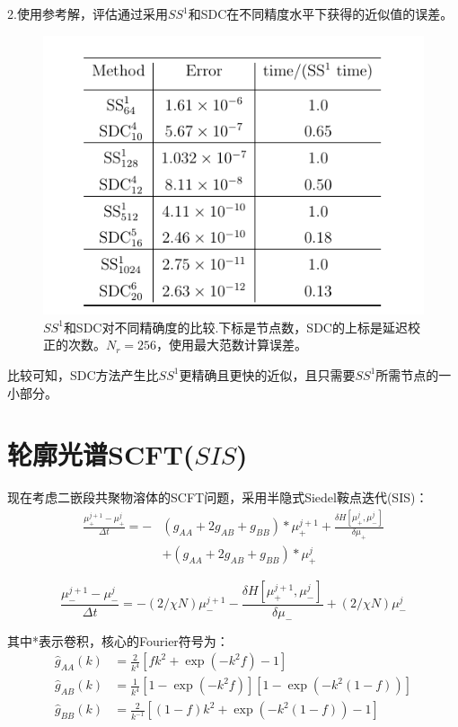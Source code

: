 2.使用参考解，评估通过采用$SS^1$和SDC在不同精度水平下获得的近似值的误差。

\begin{figure}[ht]
	\centering
	\includegraphics[scale=0.5]{8.png}
	\caption{$SS^1$和SDC对不同精确度的比较.下标是节点数，SDC的上标是延迟校正的次数。$N_r = 256$，使用最大范数计算误差。}
	\label{fig:pathdemo}
\end{figure}

比较可知，SDC方法产生比$SS^1$更精确且更快的近似，且只需要$SS^1$所需节点的一小部分。

\section{轮廓光谱SCFT($SIS$)}
现在考虑二嵌段共聚物溶体的SCFT问题，采用半隐式Siedel鞍点迭代(SIS)：
\begin{equation}
\begin{aligned} \frac{\mu_{+}^{j+1}-\mu_{+}^{j}}{\Delta t}=-&\left(g_{A A}+2 g_{A B}+g_{B B}\right) * \mu_{+}^{j+1}+\frac{\delta H\left[\mu_{+}^{j}, \mu_{-}^{j}\right]}{\delta \mu_{+}} \\ &+\left(g_{A A}+2 g_{A B}+g_{B B}\right) * \mu_{+}^{j} \end{aligned}
\end{equation}

\begin{equation}
\frac{\mu_{-}^{j+1}-\mu_{-}^{j}}{\Delta t}=-(2 / \chi N) \mu_{-}^{j+1}-\frac{\delta H\left[\mu_{+}^{j+1}, \mu_{-}^{j}\right]}{\delta \mu_{-}}+(2 / \chi N) \mu_{-}^{j}
\end{equation}

其中*表示卷积，核心的Fourier符号为：
\begin{equation}
\begin{aligned} 
\hat{g}_{AA}(k) &=\frac{2}{k^{4}}\left[f k^{2}+\exp \left(-k^{2} f\right)-1\right] \\ \hat{g}_{A B}(k) &=\frac{1}{k^{4}}\left[1-\exp \left(-k^{2} f\right)\right]\left[1-\exp \left(-k^{2}(1-f)\right)\right] \\ \hat{g}_{B B}(k) &=\frac{2}{k^{-1}}\left[(1-f) k^{2}+\exp \left(-k^{2}(1-f)\right)-1\right] 
\end{aligned}
\end{equation}

